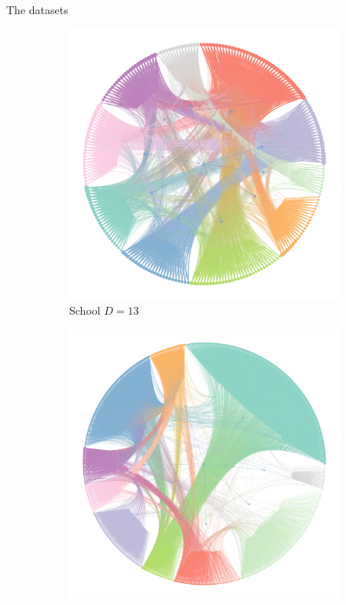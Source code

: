 \documentclass{beamer}
\begin{document}
\begin{frame}{The datasets}
\begin{figure}[!h]
\begin{subfigure}[t]{0.3\linewidth}
				\includegraphics[width=\linewidth]{school-graph.png}
				\caption{School $D=13$}
				\label{fig:school-graph}
			\end{subfigure}
			\hfill
			\begin{subfigure}[t]{0.3\linewidth}
				\centering
				\includegraphics[width=\linewidth]{fb-graph.png}

\end{subfigure}
\end{figure}
\end{frame}
\end{document}
